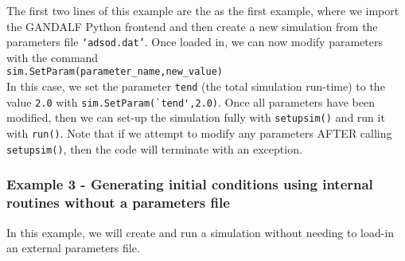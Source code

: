 \documentclass[a4paper]{article}
\newcommand{\var}[1]{\texttt{#1}}
\newcommand{\singlecommand}[1]{\\ \newline \indent \var{#1} \\ \newline \noindent}
\begin{document}





\noindent The first two lines of this example are the as the first example, where we import the GANDALF Python frontend and then create a new simulation from the parameters file \var{`adsod.dat'}.  Once loaded in, we can now modify parameters with the command \singlecommand{sim.SetParam(parameter\_name,new\_value)}  In this case, we set the parameter \var{tend} (the total simulation run-time) to the value \var{2.0} with \lstinline{sim.SetParam(`tend',2.0)}.  Once all parameters have been modified, then we can set-up the simulation fully with \lstinline{setupsim()} and run it with \lstinline{run()}.  Note that if we attempt to modify any parameters AFTER calling \lstinline{setupsim()}, then the code will terminate with an exception.


\subsubsection{Example 3 - Generating initial conditions using internal routines without a parameters file}
In this example, we will create and run a simulation without needing to load-in an external parameters file. \\
\end{document}
